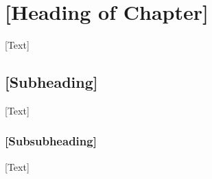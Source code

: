 \section{[Heading of Chapter]}

[Text]



\subsection{[Subheading]}

[Text]

\subsubsection{[Subsubheading]}

[Text]

